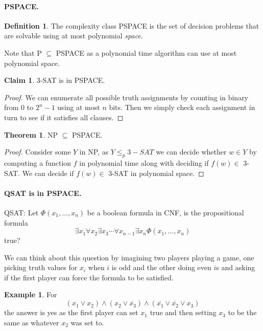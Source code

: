 \documentclass[11pt,a4paper]{article}
\theoremstyle{definition}
\newtheorem{thm}{Theorem}
\newtheorem{claim}{Claim}
\newtheorem{defn}{Definition}
\newtheorem*{ex}{Example}
\begin{document}
\paragraph{PSPACE.}
\begin{defn}
The complexity class PSPACE is the set of decision problems that are solvable using at most polynomial \emph{space}.
\end{defn}

Note that P $\subseteq$ PSPACE as a polynomial time algorithm can use at most polynomial space.

\begin{claim}
3-SAT is in PSPACE.
\end{claim}
\begin{proof}
We can enumerate all possible truth assignments by counting in binary from 0 to $2^{n}-1$ using at most $n$ bits.
Then we simply check each assignment in turn to see if it satisfies all clauses.
\end{proof}

\begin{thm}
NP $\subseteq$ PSPACE.
\end{thm}
\begin{proof}
Consider some $Y$ in NP, as $Y \le_p 3-SAT$ we can decide whether $w \in Y$ by computing a function $f$ in polynomial time along with deciding if $f(w) \in$ 3-SAT.
We can decide if $f(w)\in $ 3-SAT in polynomial space.
\end{proof}

\paragraph{QSAT is in PSPACE.}
QSAT: Let $\Phi(x_1,\ldots,x_n)$ be a boolean formula in CNF, is the propositional formula
\[
\exists x_1 \forall x_2 \exists x_3 \cdots \forall x_{n-1} \exists x_n \Phi(x_1,\ldots,x_n)
\]
true?

We can think about this question by imagining two players playing a game, one picking truth values for $x_i$ when $i$ is odd and the other doing even $i$s and asking if the first player can force the formula to be satisfied.

\begin{ex}
For
\[
(x_1 \vee x_2)\wedge(x_2 \vee\overline{x_3}) \wedge (\overline{x_1} \vee \overline{x_2} \vee x_3)
\]
the answer is yes as the first player can set $x_1$ true and then setting $x_3$ to be the same as whatever $x_2$ was set to.
\end{ex}
\end{document}
